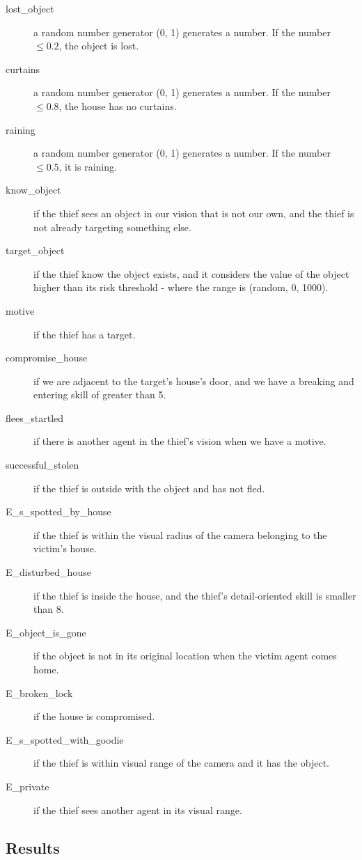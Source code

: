 \begin{description}
\item[lost\_object  ] a random number generator (0, 1) generates a number. If the number $\leq 0.2$, the object is lost.
\item[curtains] a random number generator (0, 1) generates a number. If the number $\leq 0.8$, the house has no curtains. 
\item[raining]  a random number generator (0, 1) generates a number. If the number $\leq 0.5$, it is raining. 
\item[know\_object]  if the thief sees an object in our vision that is not our own, and the thief is not already targeting something else.
\item[target\_object]   if the thief know the object exists, and it considers the value of the object higher than its risk threshold - where the range is (random, 0, 1000).
\item[motive]  if the thief has a target.
\item[compromise\_house]  if we are adjacent to the target's house's door, and we have a breaking and entering skill of greater than 5.
\item[flees\_startled]  if there is another agent in the thief's vision when we have a motive.
\item[successful\_stolen] if the thief is outside with the object and has not fled.
\item[E\_s\_spotted\_by\_house]  if the thief is within the visual radius of the camera belonging to the victim's house.
\item[E\_disturbed\_house]  if the thief is inside the house, and the thief's detail-oriented skill is smaller than 8. 
\item[E\_object\_is\_gone]  if the object is not in its original location when the victim agent comes home.
\item[E\_broken\_lock]  if the house is compromised.
\item[E\_s\_spotted\_with\_goodie]  if the thief is within visual range of the camera and it has the object.
\item[E\_private]  if the thief sees another agent in its visual range.

\end{description}

\subsection{Results}

